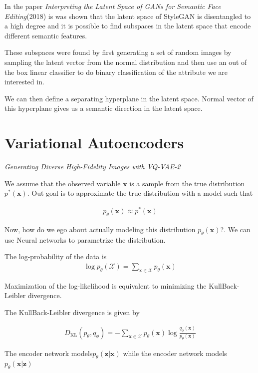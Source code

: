 In the paper \textit{Interpreting the Latent Space of GANs for Semantic Face Editing}(2018)\cite{interfacegan} is was shown that the latent space of StyleGAN is disentangled to a high degree and it is possible to find subspaces in the latent space that encode different semantic features.

These subspaces were found by first generating a set of random images by sampling the latent vector from the normal distribution and then use an out of the box linear classifier to do binary classification of the attribute we are interested in.

We can then define a separating hyperplane in the latent space. Normal vector of this hyperplane gives us a semantic direction in the latent space.




\section{Variational Autoencoders}

\textit{Generating Diverse High-Fidelity Images with VQ-VAE-2}\cite{vqvae2}


We assume that the observed variable $\mathbf{x}$ is a sample from the true distribution $p^*(\mathbf{x})$.\cite{vaeintro} Out goal is to approximate the true distribution with a model such that

\begin{align}
  p_\theta(\mathbf{x})\approx p^*(\mathbf{x})
\end{align}

Now, how do we ego about actually modeling this distribution $p_\theta(\mathbf{x})$?. We can use Neural networks to parametrize the distribution.

The log-probability of the data is
\begin{align}
  \log p_\theta(\mathcal{X}) = \sum_{\mathbf{x}\in\mathcal{X}} p_\theta(\mathbf{x})
\end{align}

Maximization of the log-likelihood is equivalent to minimizing the KullBack-Leibler divergence.

The KullBack-Leibler divergence is given by

\begin{align}
D_{\text{KL}}(p_\theta,q_\phi) = -\sum_{\mathbf{x}\in\mathcal{X}}p_\theta(\mathbf{x})\log \frac{q_\phi(\mathbf{x})}{p_\theta(\mathbf{x})}
\end{align}

The encoder network models$p_\theta(\mathbf{z}|\mathbf{x})$ while the encoder network models $p_\theta(\mathbf{x}|\mathbf{z})$
